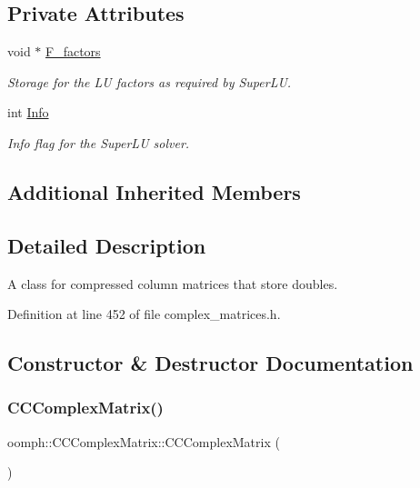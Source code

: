 \subsection*{Private Attributes}
\begin{DoxyCompactItemize}
\item 
void $\ast$ \hyperlink{classoomph_1_1CCComplexMatrix_ac97a80e97db7930912a519ba06ef2e98}{F\+\_\+factors}
\begin{DoxyCompactList}\small\item\em Storage for the LU factors as required by Super\+LU. \end{DoxyCompactList}\item 
int \hyperlink{classoomph_1_1CCComplexMatrix_a2f306917c87df84224f9f78e96d3a100}{Info}
\begin{DoxyCompactList}\small\item\em Info flag for the Super\+LU solver. \end{DoxyCompactList}\end{DoxyCompactItemize}
\subsection*{Additional Inherited Members}


\subsection{Detailed Description}
A class for compressed column matrices that store doubles. 

Definition at line 452 of file complex\+\_\+matrices.\+h.



\subsection{Constructor \& Destructor Documentation}
\mbox{\label{classoomph_1_1CCComplexMatrix_a5978332570ff5adabc1e185edc240398}} 
\subsubsection{\texorpdfstring{C\+C\+Complex\+Matrix()}{CCComplexMatrix()}\hspace{0.1cm}{\footnotesize\ttfamily [1/3]}}
{\footnotesize\ttfamily oomph\+::\+C\+C\+Complex\+Matrix\+::\+C\+C\+Complex\+Matrix (\begin{DoxyParamCaption}{ }\end{DoxyParamCaption})\hspace{0.3cm}{\ttfamily [inline]}}



